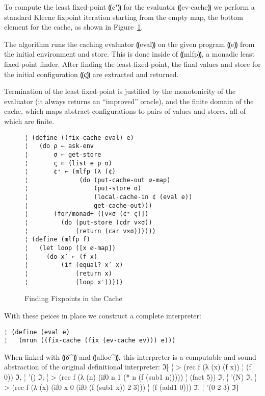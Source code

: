 To compute the least fixed-point ⸨¢⁺⸩ for the evaluator ⸨ev-cache⸩ we perform a
standard Kleene fixpoint iteration starting from the empty map, the bottom
element for the cache, as shown in Figure~\ref{f:fixing}.

The algorithm runs the caching evaluator ⸨eval⸩ on the given program ⸨e⸩ from
the initial environment and store. This is done inside of ⸨mlfp⸩, a monadic
least fixed-point finder. After finding the least fixed-point, the final values
and store for the initial configuration ⸨ς⸩ are extracted and returned.

Termination of the least fixed-point is justified by the monotonicity of the
evaluator (it always returns an “improved” oracle), and the finite domain of
the cache, which maps abstract configurations to pairs of values and stores,
all of which are finite.

\begin{figure} %
\begin{lstlisting}
¦ (define ((fix-cache eval) e)  
¦   (do ρ ← ask-env
¦       σ ← get-store
¦       ς ≔ (list e ρ σ)
¦       ¢⁺ ← (mlfp (λ (¢) 
¦              (do (put-cache-out ∅-map)
¦                  (put-store σ)
¦                  (local-cache-in ¢ (eval e))
¦                  get-cache-out)))
¦       (for/monad+ ([v×σ (¢⁺ ς)])
¦         (do (put-store (cdr v×σ))
¦             (return (car v×σ))))))
¦ (define (mlfp f)
¦   (let loop ([x ∅-map])
¦     (do x′ ← (f x)
¦         (if (equal? x′ x)
¦             (return x)
¦             (loop x′)))))
\end{lstlisting}
\caption{Finding Fixpoints in the Cache}
\label{f:fixing}
\end{figure} %

With these peices in place we construct a complete interpreter:
\begin{lstlisting}
¦ (define (eval e)
¦   (mrun ((fix-cache (fix (ev-cache ev))) e)))
\end{lstlisting}
When linked with ⸨δ^⸩ and ⸨alloc^⸩, this interpreter is
a computable and sound abstraction of the original definitional interpreter:
ℑ⁅
¦ > (rec f (λ (x) (f x))
¦     (f 0))
ℑ,
¦ '()
ℑ;
¦ > (rec f (λ (n) (if0 n 1 (* n (f (sub1 n)))))
¦     (fact 5))
ℑ,
¦ '(N)
ℑ;
¦ > (rec f (λ (x) (if0 x 0 (if0 (f (sub1 x)) 2 3)))
¦      (f (add1 0)))
ℑ,
¦ '(0 2 3)
ℑ⁆

